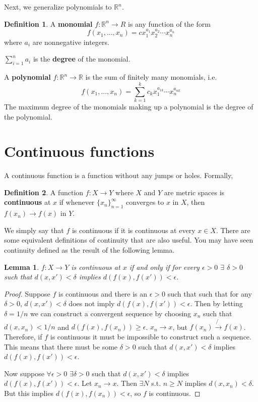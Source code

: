 \documentclass[12pt,reqno]{amsart}
\newtheorem{lemma}{Lemma}[section]
\theoremstyle{definition}
\newtheorem{definition}{Definition}[section]
\def\R{\mathbb{R}}
\newcommand{\seq}[1]{\{{#1}_n \}_{n=1}^\infty }
\renewcommand{\to}{{\rightarrow}}
\begin{document}
Next, we generalize polynomials to $\R^n$. 
\begin{definition}
  A \textbf{monomial} $f:\R^n \to R$ is any function of the form
  \[ f(x_1, ..., x_n) = c x_1^{a_1} x_2^{a_2} \cdots x_n^{a_n} \]
  where $a_i$ are nonnegative integers. 

  $\sum_{i=1}^n a_i$ is the \textbf{degree} of the monomial. 

  A \textbf{polynomial} $f:\R^n \to \R$ is the sum of finitely many
  monomials, i.e.
  \[ f(x_1, ..., x_n) = \sum_{k=1}^k c_k x_1^{a_{1k}}\cdots
  x_n^{a_{nk}} \]
  The maximum degree of the monomials making up a polynomial is the
  degree of the polynomial.
\end{definition}

\section{Continuous functions}

A continuous function is a function without any jumps or
holes. Formally,
\begin{definition}
  A function $f:X \to Y$ where $X$ and $Y$ are metric spaces is
  \textbf{continuous} at $x$ if whenever $\seq{x}$ converges to $x$ in
  $X$, then $f(x_n) \to f(x)$ in $Y$.  
\end{definition}
We simply say that $f$ is continuous if it is continuous at every $x
\in X$.  There are some equivalent definitions of continuity that are
also useful. You may have seen continuity defined as the result of the
following lemma.
\begin{lemma}\label{lem:ced}
  $f: X \to Y$ is continuous at $x$ if and only if for every
  $\epsilon>0$ $\exists$ $\delta >0$ such that $d(x,x') < \delta $
  implies $d(f(x),f(x')) < \epsilon$.
\end{lemma}
\begin{proof}
  Suppose $f$ is continuous and there is an $\epsilon>0$ such that
  such that for any $\delta>0$, $d(x,x') < \delta$ does not imply
  $d(f(x),f(x'))< \epsilon$. Then by letting $\delta = 1/n$ we can
  construct a convergent sequence by choosing $x_n$ such that
  $d(x,x_n) < 1/n$ and $d(f(x),f(x_n)) \geq \epsilon$. $x_n \to x$,
  but $f(x_n) \not\to f(x)$. Therefore, if $f$ is continuous it must
  be impossible to construct such a sequence. This means that there
  must be some $\delta>0$ such that $d(x,x') < \delta$ implies
  $d(f(x),f(x')) < \epsilon$.

  Now suppose $\forall \epsilon>0$ $\exists \delta>0$ such that
  $d(x,x')<\delta$ implies $d(f(x),f(x')) <\epsilon$. Let $x_n \to
  x$. Then $\exists N$ s.t. $n\geq N$ implies $d(x,x_n) < \delta$. But
  this implies $d(f(x),f(x_n)) < \epsilon$, so $f$ is continuous.
\end{proof}
\end{document}
